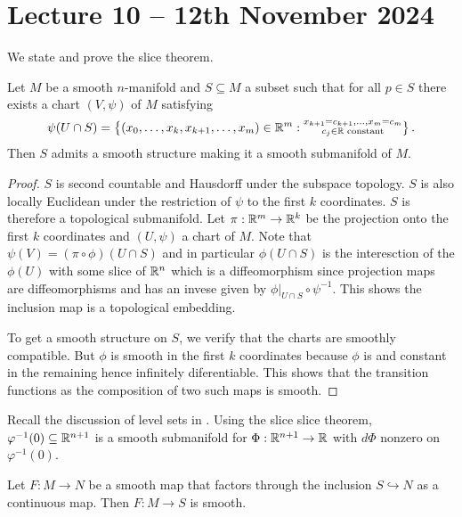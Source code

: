 \section{Lecture 10 -- 12th November 2024}\label{sec: lecture 10}
We state and prove the slice theorem. 
\begin{theorem}[Slice]\label{thm: slice}
    Let $M$ be a smooth $n$-manifold and $S\subseteq M$ a subset such that for all $p\in S$ there exists a chart $(V,\psi)$ of $M$ satisfying 
    $$\psi(U\cap S)=\left\{(x_{0},\dots,x_{k},x_{k+1},\dots,x_{m})\in\mathbb{R}^{m}:\substack{x_{k+1}=c_{k+1},\dots,x_{m}=c_{m}\\c_{j}\in\mathbb{R}\text{ constant}}\right\}.$$
    Then $S$ admits a smooth structure making it a smooth submanifold of $M$. 
\end{theorem}
\begin{proof}
    $S$ is second countable and Hausdorff under the subspace topology. $S$ is also locally Euclidean under the restriction of $\psi$ to the first $k$ coordinates. $S$ is therefore a topological submanifold. Let $\pi:\mathbb{R}^{m}\to\mathbb{R}^{k}$ be the projection onto the first $k$ coordinates and $(U,\psi)$ a chart of $M$. Note that $\psi(V)=(\pi\circ\phi)(U\cap S)$ and in particular $\phi(U\cap S)$ is the interesction of the $\phi(U)$ with some slice of $\mathbb{R}^{n}$ which is a diffeomorphism since projection maps are diffeomorphisms and has an invese given by $\phi|_{U\cap S}\circ\psi^{-1}$. This shows the inclusion map is a topological embedding. 

    To get a smooth structure on $S$, we verify that the charts are smoothly compatible. But $\phi$ is smooth in the first $k$ coordinates because $\phi$ is and constant in the remaining hence infinitely diferentiable. This shows that the transition functions as the composition of two such maps is smooth. 
\end{proof}
\begin{remark}
    Recall the discussion of level sets in . Using the slice slice theorem, $\varphi^{-1}(0)\subseteq\mathbb{R}^{n+1}$ is a smooth submanifold for $\Phi:\mathbb{R}^{n+1}\to\mathbb{R}$ with $d\Phi$ nonzero on $\varphi^{-1}(0)$. 
\end{remark}
\begin{lemma}\label{lem: smooth factorizations}
    Let $F:M\to N$ be a smooth map that factors through the inclusion $S\hookrightarrow N$ as a continuous map. Then $F:M\to S$ is smooth. 
\end{lemma}
